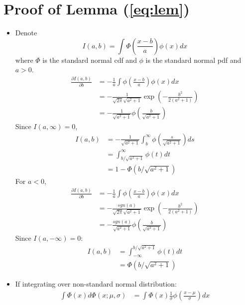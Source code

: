 \documentclass[12pt]{article}
\begin{document}
\section{Proof of Lemma (\ref{eq:lem})}
\label{sec:proof}
\begin{itemize}
\item Denote
  \begin{displaymath}
    I(a,b) = \int \Phi \left( \frac{x-b}{a} \right)\phi(x) dx 
  \end{displaymath}
  where $\Phi$ is the standard normal cdf and $\phi$ is the standard normal
  pdf and $a > 0$.
  \begin{align*}
    \frac{\partial I(a,b)}{\partial b} & = - \frac{1}{a} \int \phi \left( \frac{x-b}{a} \right) \phi(x) dx \\
    & = - \frac{1}{\sqrt{2 \pi} \sqrt{a^2+1}} \exp \left( - \frac{b^2}{2(a^2+1)} \right)\\
    & = -\frac{1}{\sqrt{a^2+1}} \phi \left( \frac{b}{\sqrt{a^2+1}} \right)
  \end{align*}
  Since $I(a, \infty) = 0$,
  \begin{align}
    I(a,b) &= - \frac{1}{\sqrt{a^2+1}} \int_b^{\infty} \phi \left( \frac{s}{\sqrt{a^2+1}} \right) ds \nonumber \\
    &= \int_{b/\sqrt{a^2+1}}^{\infty} \phi(t) dt \nonumber\\
    \label{eq:int}
    & = 1- \Phi(b/\sqrt{a^2+1})
  \end{align}
  For $a < 0$,
  \begin{align*}
    \frac{\partial I(a,b)}{\partial b} & = - \frac{1}{a} \int \phi \left( \frac{x-b}{a} \right) \phi(x) dx \\
    & = - \frac{sgn(a)}{\sqrt{2 \pi} \sqrt{a^2+1}} \exp \left( - \frac{b^2}{2(a^2+1)} \right)\\
    & = -\frac{sgn(a)}{\sqrt{a^2+1}} \phi \left( \frac{b}{\sqrt{a^2+1}}
    \right)
  \end{align*}
  Since $I(a, -\infty) = 0$:
  \begin{align}
    I(a,b) &= \int^{b/\sqrt{a^2+1}}_{-\infty} \phi(t) dt \nonumber\\
    \label{eq:intneg}
    & = \Phi(b/\sqrt{a^2+1})
  \end{align}
\item If integrating over non-standard normal distribution:
  \begin{align*}
    \int \Phi(x)d\Phi(x; \mu, \sigma) & = \int \Phi(x) \frac{1}{\sigma} \phi \left( \frac{x-\mu}{\sigma} \right) dx \\

\end{align*}
\end{itemize}
\end{document}
